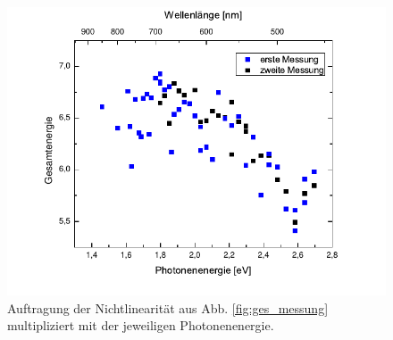 \documentclass[bachelor,       %
               twoside,        %
               BCOR10mm,       %
               english,ngerman, %
               ]{GAUBM}
\begin{document}
\begin{figure}[h!]
\centering
\includegraphics{Gesamtenergie}
\caption{Auftragung der Nichtlinearität aus Abb. \ref{fig:ges_messung} multipliziert mit der jeweiligen Photonenenergie.}
\label{fig:ges_energie}
\end{figure}
\end{document}

